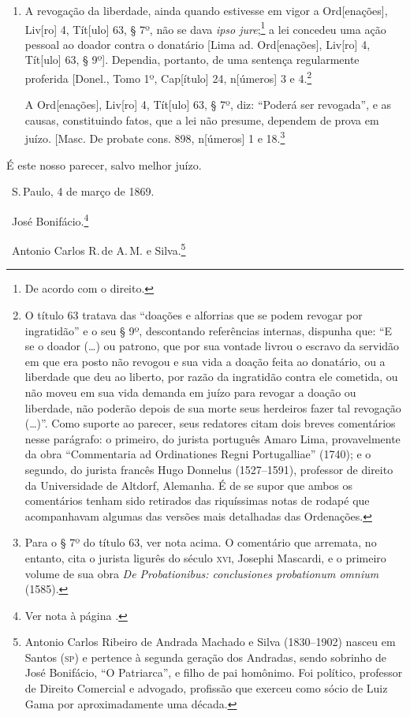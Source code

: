 \begin{enumerate}[label=Ao \arabic*º]
\item A revogação da liberdade, ainda quando estivesse em vigor a
Ord{[}enações{]}, Liv{[}ro{]} 4, Tít{[}ulo{]} 63, § 7º, não se dava
\emph{ipso jure};\footnote{De acordo com o direito.} a lei concedeu
uma ação pessoal ao doador contra o donatário {[}Lima ad.
Ord{[}enações{]}, Liv{[}ro{]} 4, Tít{[}ulo{]} 63, § 9º{]}. Dependia,
portanto, de uma sentença regularmente proferida {[}Donel., Tomo 1º,
Cap{[}ítulo{]} 24, n{[}úmeros{]} 3 e 4.\footnote{O título 63 tratava
  das ``doações e alforrias que se podem revogar por ingratidão'' e o seu
  § 9º, descontando referências internas, dispunha que: ``E se o doador
  (\ldots{}) ou patrono, que por sua vontade livrou o escravo da servidão em
  que era posto não revogou e sua vida a doação feita ao donatário, ou a
  liberdade que deu ao liberto, por razão da ingratidão contra ele
  cometida, ou não moveu em sua vida demanda em juízo para revogar a
  doação ou liberdade, não poderão depois de sua morte seus herdeiros
  fazer tal revogação (\ldots{})''. Como suporte ao parecer, seus redatores
  citam dois breves comentários nesse parágrafo: o primeiro, do jurista
  português Amaro Lima, provavelmente da obra ``Commentaria ad
  Ordinationes Regni Portugalliae'' (1740); e o segundo, do jurista
  francês Hugo Donnelus (1527--1591), professor de direito da
  Universidade de Altdorf, Alemanha. É de se supor que ambos os
  comentários tenham sido retirados das riquíssimas notas de rodapé que
  acompanhavam algumas das versões mais detalhadas das Ordenações.}

A Ord{[}enações{]}, Liv{[}ro{]} 4, Tít{[}ulo{]} 63, § 7º, diz: ``Poderá
ser revogada'', e as causas, constituindo fatos, que a lei não presume,
dependem de prova em juízo. {[}Masc. De probate cons. 898, n{[}úmeros{]}
1 e 18.\footnote{Para o § 7º do título 63, ver nota acima. O
  comentário que arremata, no entanto, cita o jurista ligurês do século
  \textsc{xvi}, Josephi Mascardi, e o primeiro volume de sua obra \emph{De
  Probationibus: conclusiones probationum omnium} (1585).}
\end{enumerate}

É este nosso parecer, salvo melhor juízo.

\hfill\ S.\,Paulo, 4 de março de 1869.\smallskip

\hfill\ José Bonifácio.\footnote{Ver nota à página \pageref{bonifacio}.}

\hfill\ Antonio Carlos R.\,de A.\,M. e Silva.\footnote{Antonio Carlos Ribeiro de
  Andrada Machado e Silva (1830--1902) nasceu em Santos (\textsc{sp}) e pertence à
  segunda geração dos Andradas, sendo sobrinho de José Bonifácio, ``O
  Patriarca'', e filho de pai homônimo. Foi político, professor de \label{machado}
  Direito Comercial e advogado, profissão que exerceu como sócio de Luiz
  Gama por aproximadamente uma década.}

